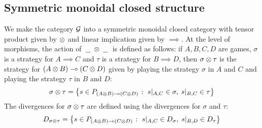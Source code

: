 \documentclass{article}
\begin{document}
\subsection{Symmetric monoidal closed structure}

We make the category $\mathcal G$ into a symmetric monoidal closed category with tensor product given by $\otimes$ and linear implication given by $\implies$.  At the level of morphisms, the action of $\;\underline{\hspace{1.5ex}}\;\otimes\;\underline{\hspace{1.5ex}}\;$ is defined as follows: if $A,B,C,D$ are games, $\sigma$ is a strategy for $A\implies C$ and $\tau$ is a strategy for $B\implies D$, then $\sigma\otimes\tau$ is the strategy for $(A\otimes B)\multimap (C\otimes D)$ given by playing the strategy $\sigma$ in $A$ and $C$ and playing the strategy $\tau$ in $B$ and $D$:
\[
  \sigma\otimes\tau = \left\{s\in P_{(A\otimes B)\multimap (C\otimes D)}\;\colon\; s\vert_{A,C}\in\sigma,\;s\vert_{B,C}\in\tau\right\}
  \]
The divergences for $\sigma\otimes\tau$ are defined using the divergences for $\sigma$ and $\tau$:
\[
  D_{\sigma\otimes\tau} = \left\{s\in P_{(A\otimes B)\multimap (C\otimes D)}\;\colon\; s\vert_{A,C}\in D_\sigma,\;s\vert_{B,D}\in D_\tau\right\}
  \]
\end{document}
